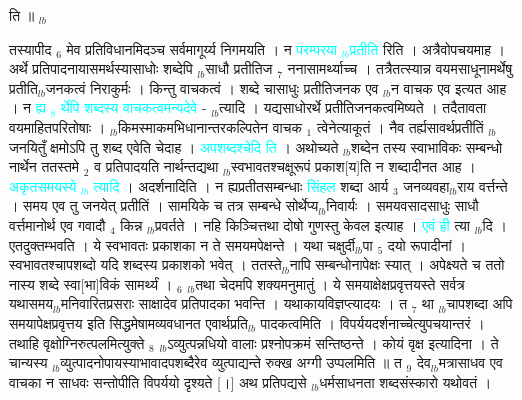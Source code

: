 \documentclass[article,12pt,a4paper]{memoir}%
\newcommand{\quotelemma}[1]{\textcolor{cyan}{#1}}
\newcounter{parCount}
\begin{document}
	  
	  
	    \pstart  \leavevmode%
	    \hphantom{.}
	   ति ॥
	{}
	\pend%
      {\tiny $_{lb}$}

	  
	  \pstart \leavevmode%
	तस्यापीद {\tiny $_{6}$} मेव प्रतिविधानमिदञ्च सर्वमागूर्य्य निगमयति । न \quotelemma{परम्परया {\tiny $_{lb}$}प्रतीति} रिति । अत्रैवोपचयमाह । अर्थे प्रतिपादनायासमर्थस्यासाधोः शब्देपि {\tiny $_{lb}$}साधौ प्रतीतिज {\tiny $_{7}$} ननासामर्थ्याच्च । तत्रैतत्स्यान्न वयमसाधूनामर्थेषु प्रतीति{\tiny $_{lb}$}जनकत्वं निराकुर्मः । किन्तु वाचकत्वं । शब्दे चासाधुः प्रतीतिजनक एव {\tiny $_{lb}$}न वाचक एव इत्यत आह । न \quotelemma{ह्य {\tiny $_{8}$} \leavevmode\ledsidenote{\textenglish{66a/msK}} र्थेपि शब्दस्य वाचकत्वमन्यदेवे} \cite[14b4]{vn-msN}- {\tiny $_{lb}$}त्यादि । यद्यसाधोरर्थे प्रतीतिजनकत्वमिष्यते । तदैतावता वयमाहितपरितोषाः । {\tiny $_{lb}$}किमस्माकमभिधानान्तरकल्पितेन वाचक {\tiny $_{1}$} त्वेनेत्याकूतं । नैव तर्ह्यसावर्थप्रतीतिं {\tiny $_{lb}$}जनयितुँ क्षमोऽपि तु शब्द एवेति चेदाह । \quotelemma{अपशब्दश्चेदि \cite[14b4]{vn-msN} ति} । अथोच्यते {\tiny $_{lb}$}शब्देन तस्य स्वाभाविकः सम्बन्धो नार्थेन ततस्तमे {\tiny $_{2}$} व प्रतिपादयति नार्थन्तद्यथा {\tiny $_{lb}$}स्वभावतश्चक्षूरूपं प्रकाश[य]ति न शब्दादीनत आह । \quotelemma{अकृतसमयस्ये \cite[14b5]{vn-msN} {\tiny $_{lb}$} त्यादि} । अदर्शनादिति । न ह्यप्रतीतसम्बन्धाः \quotelemma{सिंहल} शब्दा आर्य {\tiny $_{3}$} जनव्यवहा{\tiny $_{lb}$}राय वर्त्तन्ते । समय एव तु जनयेत् प्रतीतिं । सामयिके च तत्र सम्बन्धे सोर्थेप्य{\tiny $_{lb}$}निवार्यः । समयवसादसाधुः साधौ वर्त्तमानोर्थ एव गवादौ {\tiny $_{4}$} किन्न {\tiny $_{lb}$}प्रवर्तते । नहि किञ्चित्तथा दोषो गुणस्तु केवल इत्याह । \quotelemma{एवं ही} त्या \cite[14b6]{vn-msN} {\tiny $_{lb}$}दि । एतदुक्तम्भवति । ये स्वभावतः प्रकाशका न ते समयमपेक्षन्ते । यथा चक्षुर्दी{\tiny $_{lb}$}पा {\tiny $_{5}$} दयो रूपादीनां । स्वभावतश्चापशब्दो यदि शब्दस्य प्रकाशको भवेत् । ततस्ते{\tiny $_{lb}$}नापि सम्बन्धोनापेक्षः स्यात् । अपेक्ष्यते च ततो नास्य शब्दे स्वा[भा]विकं सामर्थ्यं । {\tiny $_{6}$} {\tiny $_{lb}$}तथा चेदमपि शक्यमनुमातुं । ये समयाक्षेक्षप्रवृत्तयस्ते सर्वत्र यथासमय{\tiny $_{lb}$}मनिवारितप्रसराः साक्षादेव प्रतिपादका भवन्ति । यथाकायविज्ञप्त्यादयः । त {\tiny $_{7}$} था {\tiny $_{lb}$}चापशब्दा अपि समयापेक्षप्रवृत्तय इति सिद्धमेषामव्यवधानत एवार्थप्रति{\tiny $_{lb}$} \leavevmode{} पादकत्वमिति । विपर्ययदर्शनाच्चेत्युपचयान्तरं । तथाहि वृक्षोग्निरुत्पलमित्युक्ते {\tiny $_{8}$} {\tiny $_{lb}$}ऽव्युत्पन्नधियो वालाः प्रश्नोपक्रमं सन्तिष्ठन्ते । कोयं वृक्ष इत्यादिना । ते चान्यस्य {\tiny $_{lb}$}व्युत्पादनोपायस्याभावादपशब्दैरेव व्युत्पाद्यन्ते रुक्ख अग्गी उप्पलमिति ॥ त {\tiny $_{9}$} \leavevmode{} देव{\tiny $_{lb}$}मत्रासाधव एव वाचका न साधवः सन्तोपीति विपर्ययो दृश्यते [।] अथ प्रतिपद्यसे {\tiny $_{lb}$}धर्मसाधनता शब्दसंस्कारो यथोवतं ।
\end{document}
